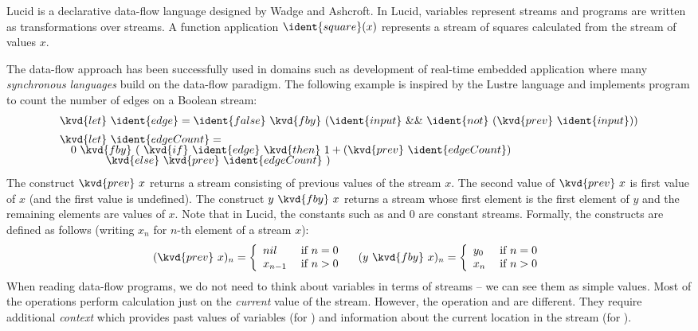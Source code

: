 Lucid \cite{app-lucid} is a declarative data-flow language designed by Wadge and Ashcroft. In Lucid, 
variables represent streams and programs are written as transformations over streams. A function 
application $\ident{square}(x)$ represents a stream of squares calculated from the stream of values $x$.

The data-flow approach has been successfully used in domains such as development of real-time embedded 
application where many \emph{synchronous languages} \cite{app-synchronous-lang} build on the data-flow
paradigm. The following example is inspired by the Lustre \cite{app-synchronous-lustre} language
and implements program to count the number of edges on a Boolean stream:
%
\begin{equation*}
\begin{array}{l}
\kvd{let}~\ident{edge} = \ident{false}~\kvd{fby}~(\ident{input}~\&\&~\ident{not}~(\kvd{prev}~\ident{input}))
\\[0.5em]
\kvd{let}~\ident{edgeCount} = \\[-0.25em]
\quad 0~\kvd{fby}~ (~\kvd{if}~\ident{edge}~\kvd{then}~1 + (\kvd{prev}~\ident{edgeCount})\\[-0.25em]
\quad\quad\quad~~~\, \kvd{else}~\kvd{prev}~\ident{edgeCount} ~)
\end{array}
\end{equation*}
%
The construct $\kvd{prev}~x$ returns a stream consisting of previous values of the stream 
$x$. The second value of $\kvd{prev}~x$ is first value of $x$ (and the first
value is undefined). The construct $y~\kvd{fby}~x$ returns a stream whose first element is the 
first element of $y$ and the remaining elements are values of $x$. Note that in Lucid, the constants
such as  and $0$ are constant streams. Formally, the constructs are defined as follows
(writing $x_n$ for $n$-th element of a stream $x$):
%
\[ 
(\kvd{prev}~x)_n = \left\{ 
  \begin{array}{ll}
    nil     & \; \text{if $n=0$}\\
    x_{n-1} & \; \text{if $n>0$}
  \end{array} \right.
\quad
(y~\kvd{fby}~x)_n = \left\{ 
  \begin{array}{ll}
    y_0     & \; \text{if $n=0$}\\
    x_n     & \; \text{if $n>0$}
  \end{array} \right.
\]  
%
When reading data-flow programs, we do not need to think about variables in terms of streams --
we can see them as simple values. Most of the operations perform calculation just on the 
\emph{current} value of the stream. However, the operation  and  are different.
They require additional \emph{context} which provides past values of variables
(for ) and information about the current location in the stream (for ). 

